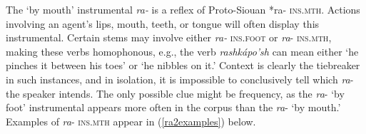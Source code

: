 \label{ParaByMouth}

The `by mouth' instrumental \textit{ra-} is a reflex of Proto-Siouan *ra- \textsc{ins.mth}. Actions involving an agent's lips, mouth, teeth, or tongue will often display this instrumental. Certain stems may involve either \textit{ra-} \textsc{ins.foot} or \textit{ra}- \textsc{ins.mth}, making these verbs homophonous, e.g., the verb \textit{rashkápo'sh} can mean either `he pinches it between his toes' or `he nibbles on it.' Context is clearly the tiebreaker in such instances, and in isolation, it is impossible to conclusively tell which \textit{ra}- the speaker intends. The only possible clue might be frequency, as the \textit{ra}- `by foot' instrumental appears more often in the corpus than the \textit{ra}- `by mouth.' Examples of \textit{ra}- \textsc{ins.mth} appear in (\ref{ra2examples}) below.

